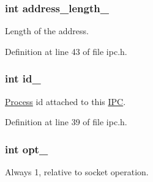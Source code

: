 \subsubsection[{\texorpdfstring{address\+\_\+length\+\_\+}{address_length_}}]{\setlength{\rightskip}{0pt plus 5cm}int address\+\_\+length\+\_\+\hspace{0.3cm}{\ttfamily [private]}}\hypertarget{classdistributed__system_1_1IPC_ac9d328f95fad3be2cd1b2aa3bfbe0e9d}{}\label{classdistributed__system_1_1IPC_ac9d328f95fad3be2cd1b2aa3bfbe0e9d}


Length of the address. 



Definition at line 43 of file ipc.\+h.

\subsubsection[{\texorpdfstring{id\+\_\+}{id_}}]{\setlength{\rightskip}{0pt plus 5cm}int id\+\_\+\hspace{0.3cm}{\ttfamily [private]}}\hypertarget{classdistributed__system_1_1IPC_aafd0c2f55b73e7a1d4bd1174fdebbcf8}{}\label{classdistributed__system_1_1IPC_aafd0c2f55b73e7a1d4bd1174fdebbcf8}


\hyperlink{classdistributed__system_1_1Process}{Process} id attached to this \hyperlink{classdistributed__system_1_1IPC}{I\+PC}. 



Definition at line 39 of file ipc.\+h.

\subsubsection[{\texorpdfstring{opt\+\_\+}{opt_}}]{\setlength{\rightskip}{0pt plus 5cm}int opt\+\_\+\hspace{0.3cm}{\ttfamily [private]}}\hypertarget{classdistributed__system_1_1IPC_a7f99d156ebf648d3ff1c3f1db1b84e99}{}\label{classdistributed__system_1_1IPC_a7f99d156ebf648d3ff1c3f1db1b84e99}


Always 1, relative to socket operation. 



